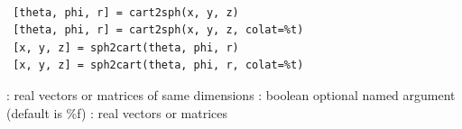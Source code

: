
\begin{mandesc}
   \\
\end{mandesc}

\begin{calling_sequence}
\begin{verbatim}
 [theta, phi, r] = cart2sph(x, y, z)
 [theta, phi, r] = cart2sph(x, y, z, colat=%t)
 [x, y, z] = sph2cart(theta, phi, r)
 [x, y, z] = sph2cart(theta, phi, r, colat=%t)
\end{verbatim}
\end{calling_sequence}

\begin{parameters}
  \begin{varlist}
    : real vectors or matrices of same dimensions
    : boolean optional named argument (default is \%f)
    : real vectors or matrices
  \end{varlist}
\end{parameters}

